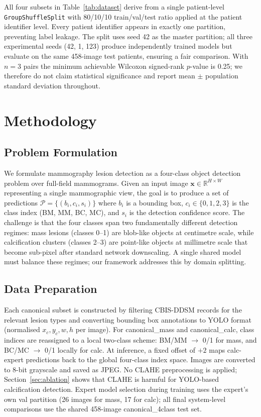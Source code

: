 \documentclass[runningheads]{llncs}
\begin{document}
All four subsets in Table~\ref{tab:dataset} derive from a single
patient-level \texttt{GroupShuffleSplit} \cite{pedregosa2011scikit}
with 80/10/10 train/val/test ratio applied at the patient identifier
level. Every patient identifier appears in exactly one partition,
preventing label leakage. The split uses seed 42 as the master
partition; all three experimental seeds (42, 1, 123) produce
independently trained models but evaluate on the same 458-image test
patients, ensuring a fair comparison. With $n=3$ pairs the minimum
achievable Wilcoxon signed-rank $p$-value is 0.25; we therefore do not
claim statistical significance and report mean $\pm$ population standard
deviation throughout.

\section{Methodology}
\label{sec:method}

\subsection{Problem Formulation}

We formulate mammography lesion detection as a four-class object
detection problem over full-field mammograms. Given an input image
$\mathbf{x} \in \mathbb{R}^{H \times W}$ representing a single
mammographic view, the goal is to produce a set of predictions
$\mathcal{P} = \{(b_i, c_i, s_i)\}$ where $b_i$ is a bounding box,
$c_i \in \{0,1,2,3\}$ is the class index (BM, MM, BC, MC), and $s_i$
is the detection confidence score. The challenge is that the four
classes span two fundamentally different detection regimes: mass lesions
(classes 0--1) are blob-like objects at centimetre scale, while
calcification clusters (classes 2--3) are point-like objects at
millimetre scale that become sub-pixel after standard network
downscaling. A single shared model must balance these regimes; our
framework addresses this by domain splitting.

\subsection{Data Preparation}

Each canonical subset is constructed by filtering CBIS-DDSM records
for the relevant lesion types and converting bounding box annotations
to YOLO format (normalised $x_c, y_c, w, h$ per image). For
canonical\_mass and canonical\_calc, class indices are reassigned to a
local two-class scheme: BM/MM $\rightarrow$ 0/1 for mass, and
BC/MC $\rightarrow$ 0/1 locally for calc. At inference, a fixed offset
of $+2$ maps calc-expert predictions back to the global four-class
index space. Images are converted to 8-bit grayscale and saved as JPEG.
No CLAHE preprocessing is applied; Section~\ref{sec:ablation} shows
that CLAHE is harmful for YOLO-based calcification detection. Expert
model selection during training uses the expert's own val partition
(26 images for mass, 17 for calc); all final system-level comparisons
use the shared 458-image canonical\_4class test set.
\end{document}
